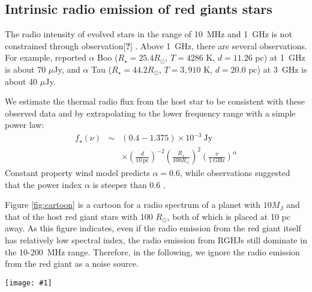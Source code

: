 \documentclass{emulateapj}
\def\memoYF#1{\color{red}$[${\bf #1}$]$ \color{black}}
\def\plotonesc#1{\centering \leavevmode
\texttt{[image: \#1]}}
\begin{document}
\subsection{Intrinsic radio emission of red giants stars}
\label{ss:RGradio}

The radio intensity of evolved stars in the range of 10~MHz and 1~GHz is not constrained through observation\memoYF{?}. 
Above 1~GHz, there are several observations. For example, \citet{gorman2013} reported $\alpha $ Boo ($R_\star = 25.4 R_{\odot }$, $T=4286$ K, $d=11.26$ pc) at 1~GHz is about 70 $\mu$Jy, and $\alpha $ Tau ($R_\star = 44.2  R_{\odot }$, $T=3,910$ K, $d=20.0$ pc) at 3~GHz is about 40 $\mu$Jy. 

We estimate the thermal radio flux from the host star to be consistent with these observed data and by extrapolating to the lower frequency range with a simple power law:
\begin{eqnarray}
\nonumber f_{\star }(\nu ) &\sim & (0.4-1.375) \times 10^{-3} ~\mbox{Jy} \\
&& \times \left( \frac{d}{10 ~\mbox{pc}} \right)^{-2}  \left( \frac{R_{\star }}{100 R_{\odot }} \right)^2 \left( \frac{\nu}{1~\mbox{GHz}} \right)^{\alpha } 
\end{eqnarray}
Constant property wind model \citep{wright1975,panagia1975,olnon1975} predicts $\alpha = 0.6$, while observations suggested that the power index $\alpha $ is steeper than 0.6 \citep{gorman2013}. 

Figure \ref{fig:cartoon} is a cartoon for a radio spectrum of a planet with $10M_J$ and that of the host red giant stars with 100 $R_{\odot }$, both of which is placed at 10 pc away. 
As this figure indicates, even if the radio emission from the red giant itself has relatively low spectral index, the radio emission from RGHJs still dominate in the 10-200~MHz range. 
Therefore, in the following, we ignore the radio emission from the red giant as a noise source. 

\begin{figure*}[tbp]
   \plotonesc{cartoon2.pdf}
   \caption{A cartoon of radio emission spectra of a RGHJ with 10$M_J$ and the host red giants with 100 $R_{\odot }$. The spectrum of RGHJ is modeled after Jovian radio spectra \citep[e.g.][]{zarka_et_al2004}, while that of the host red giant is obtained simply by extrapolating observed radio spectra above 1~GHz with power law. }
  \label{fig:cartoon}
\end{figure*}
\end{document}
